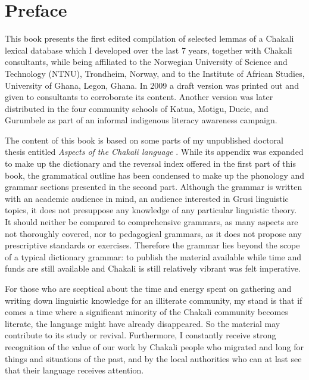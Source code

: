 \chapter*{Preface} 



This book presents the first edited compilation of selected lemmas of a Chakali 
lexical database which  I developed over the last 7 years, together with Chakali 
consultants, while being affiliated to the Norwegian University of Science and 
Technology (NTNU), Trondheim, Norway, 
 and   to the Institute of African Studies, University of Ghana, Legon, 
Ghana.   In 2009 a draft version  was printed out  and given to consultants 
to corroborate its content. Another version was later distributed in the four 
community 
schools of Katua, Motigu, Ducie,  and Gurumbele  as part of  an informal 
indigenous literacy awareness campaign. 

The content of this book is based on some
parts of my unpublished doctoral  thesis entitled   {\it Aspects of the Chakali 
language} \citep{brin11}. While its appendix was expanded to make up the 
dictionary and the  reversal index offered in the first part of this book, the 
grammatical outline has been condensed to make up the phonology and grammar 
sections presented in the second part.  Although the grammar is written with an 
academic audience in mind, an audience interested in  Grusi linguistic topics, 
it does not presuppose any knowledge of any particular linguistic theory.  It 
should neither be compared to comprehensive grammars,  as many aspects are not 
thoroughly covered,  nor to  pedagogical grammars, as it does not propose any 
prescriptive standards or exercises. Therefore the grammar lies beyond the scope 
of a typical dictionary grammar: to  publish the material available while time 
and funds are still available and Chakali is still relatively vibrant was felt  
imperative.

For those who are sceptical about the time and energy spent on gathering and 
writing down linguistic  knowledge for an illiterate community, my stand is that 
 if comes a  time where a significant minority of the Chakali community 
becomes literate, the language might have already disappeared.  So the material 
may contribute to its study or revival.  Furthermore,   I constantly receive 
strong recognition of the value of our work by Chakali people who migrated and 
long for things and situations of the past, and by the local authorities who can 
at last see that their language  receives attention.


